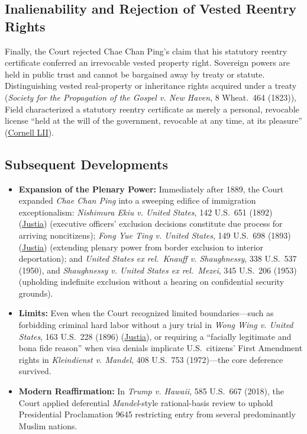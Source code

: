 \documentclass[12pt]{article}
\begin{document}
\subsection{Inalienability and Rejection of Vested Reentry Rights}
Finally, the Court rejected Chae Chan Ping's claim that his statutory reentry certificate conferred an irrevocable vested property right. Sovereign powers are held in public trust and cannot be bargained away by treaty or statute. Distinguishing vested real-property or inheritance rights acquired under a treaty (\textit{Society for the Propagation of the Gospel v. New Haven}, 8 Wheat.\ 464 (1823)), Field characterized a statutory reentry certificate as merely a personal, revocable license ``held at the will of the government, revocable at any time, at its pleasure'' (\href{https://www.law.cornell.edu/supremecourt/text/130/581}{Cornell LII}).

\subsection{Subsequent Developments}

\begin{itemize}

\item \textbf{Expansion of the Plenary Power:} Immediately after 1889, the Court expanded \textit{Chae Chan Ping} into a sweeping edifice of immigration exceptionalism: \textit{Nishimura Ekiu v. United States}, 142 U.S.\ 651 (1892) (\href{https://supreme.justia.com/cases/federal/us/142/651/}{Justia}) (executive officers' exclusion decisions constitute due process for arriving noncitizens); \textit{Fong Yue Ting v. United States}, 149 U.S.\ 698 (1893) (\href{https://supreme.justia.com/cases/federal/us/149/698/}{Justia}) (extending plenary power from border exclusion to interior deportation); and \textit{United States ex rel.\ Knauff v. Shaughnessy}, 338 U.S.\ 537 (1950), and \textit{Shaughnessy v. United States ex rel.\ Mezei}, 345 U.S.\ 206 (1953) (upholding indefinite exclusion without a hearing on confidential security grounds).

\item \textbf{Limits:} Even when the Court recognized limited boundaries---such as forbidding criminal hard labor without a jury trial in \textit{Wong Wing v. United States}, 163 U.S.\ 228 (1896) (\href{https://supreme.justia.com/cases/federal/us/163/228/}{Justia}), or requiring a ``facially legitimate and bona fide reason'' when visa denials implicate U.S.\ citizens' First Amendment rights in \textit{Kleindienst v. Mandel}, 408 U.S.\ 753 (1972)---the core deference survived.

\item \textbf{Modern Reaffirmation:} In \textit{Trump v. Hawaii}, 585 U.S.\ 667 (2018), the Court applied deferential \textit{Mandel}-style rational-basis review to uphold Presidential Proclamation 9645 restricting entry from several predominantly Muslim nations.

\end{itemize}
\end{document}
